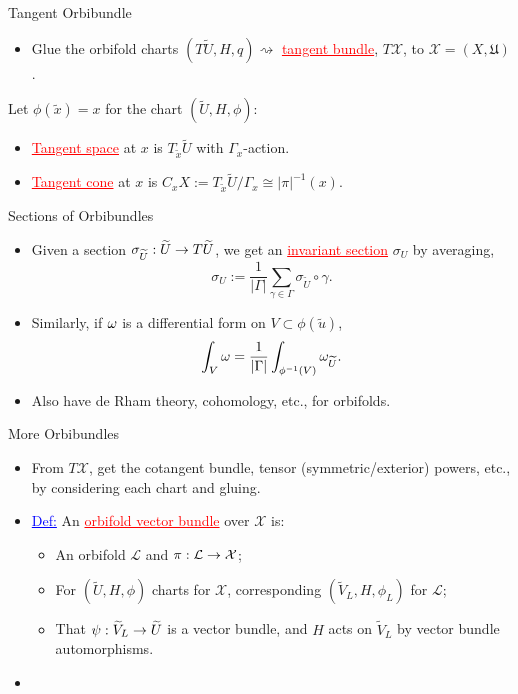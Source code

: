 \begin{frame}{Tangent Orbibundle}
    \begin{itemize}
        \item Glue the orbifold charts $(T\widetilde{U}, H, q) \rightsquigarrow$ \textcolor{red}{\underline{tangent bundle}}, $T\mathcal{X}$, to $\mathcal{X} = (X, \mathfrak{U})$.
    \end{itemize}
    Let $\phi(\tilde{x}) = x$ for the chart $(\widetilde{U}, H, \phi)$:
    \begin{itemize}
        \item \textcolor{red}{\underline{Tangent space}} at $x$ is $T_{\tilde{x}}\widetilde{U}$ with $\Gamma_{x}$-action.
        \item \textcolor{red}{\underline{Tangent cone}} at $x$ is $C_{x}X := T_{\tilde{x}}\widetilde{U}/\Gamma_{x} \cong |\pi|^{-1}(x)$.
    \end{itemize}
\end{frame}

\begin{frame}{Sections of Orbibundles}
    \begin{itemize}
        \item Given a section $\sigma_{\widetilde{U}} : \widetilde{U} \rightarrow T\widetilde{U}$, we get an \textcolor{red}{\underline{invariant section}} $\sigma_{U}$ by averaging,
        \[
            \sigma_{U} := \frac{1}{|\Gamma|}\sum_{\gamma \in \Gamma} \sigma_{\widetilde{U}} \circ \gamma.
        \]
        \item Similarly, if $\omega$ is a differential form on $V \subset \phi(\widetilde{u})$,
        \[
            \int_{V} \omega = \frac{1}{|\Gamma|}\int_{\phi^{-1}(V)} \omega_{\widetilde{U}}.
        \]
        \item Also have de Rham theory, cohomology, etc., for orbifolds.
    \end{itemize}
\end{frame}

\begin{frame}{More Orbibundles}
    \begin{itemize}
        \item From $T\mathcal{X}$, get the cotangent bundle, tensor (symmetric/exterior) powers, etc., by considering each chart and gluing.
        \item \textcolor{blue}{\underline{Def:}} An \textcolor{red}{\underline{orbifold vector bundle}} over $\mathcal{X}$ is:
        \begin{itemize}
            \item An orbifold $\mathcal{L}$ and $\pi : \mathcal{L} \rightarrow \mathcal{X}$;
            \item For $(\widetilde{U}, H, \phi)$ charts for $\mathcal{X}$, corresponding $(\widetilde{V}_{L}, H, \phi_{L})$ for $\mathcal{L}$;
            \item That $\psi : \widetilde{V}_{L} \rightarrow \widetilde{U}$ is a vector bundle, and $H$ acts on $\widetilde{V}_{L}$ by vector bundle automorphisms.
        \end{itemize}
        \item 
    \end{itemize}
\end{frame}


